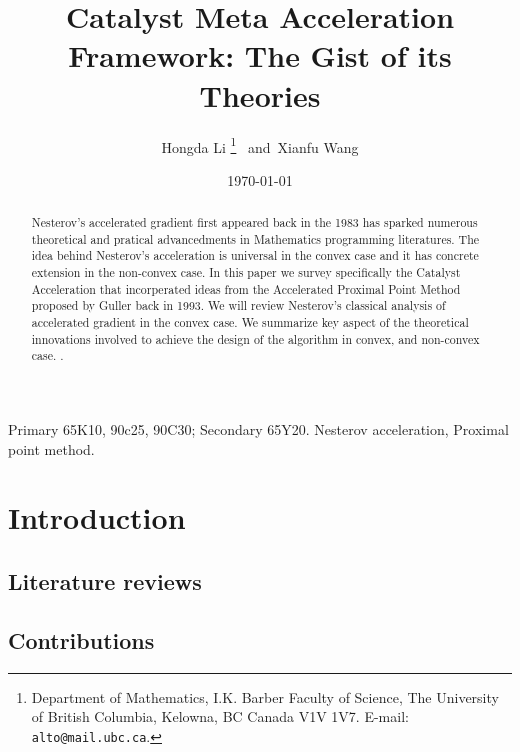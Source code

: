 \documentclass[12pt]{article}
\begin{document}
\title{
    {
        \selectfont 
        Catalyst Meta Acceleration Framework: The Gist of its Theories
    }
    }

\author{
    Hongda Li
    \thanks{Department of Mathematics, I.K. Barber Faculty of Science,
    The University of British Columbia, Kelowna, BC Canada V1V 1V7. E-mail:  \texttt{alto@mail.ubc.ca}.}~ and~Xianfu Wang
}

\date{\today}

\maketitle


\begin{abstract} 
    \noindent
    Nesterov's accelerated gradient first appeared back in the 1983 has sparked numerous theoretical and pratical advancedments in Mathematics programming literatures. 
    The idea behind Nesterov's acceleration is universal in the convex case and it has concrete extension in the non-convex case. 
    In this paper we survey specifically the Catalyst Acceleration that incorperated ideas from the Accelerated Proximal Point Method proposed by Guller back in 1993. 
    We will review Nesterov's classical analysis of accelerated gradient in the convex case. 
    We summarize key aspect of the theoretical innovations involved to achieve the design of the algorithm in convex, and non-convex case. 
    \cite{bezanson_julia_2017}. 
    
\end{abstract}

Primary 65K10, 90c25, 90C30; Secondary 65Y20. 
 Nesterov acceleration, Proximal point method. 

\section{Introduction}
    \subsection{Literature reviews}    
    \subsection{Contributions}
    
\end{document}
